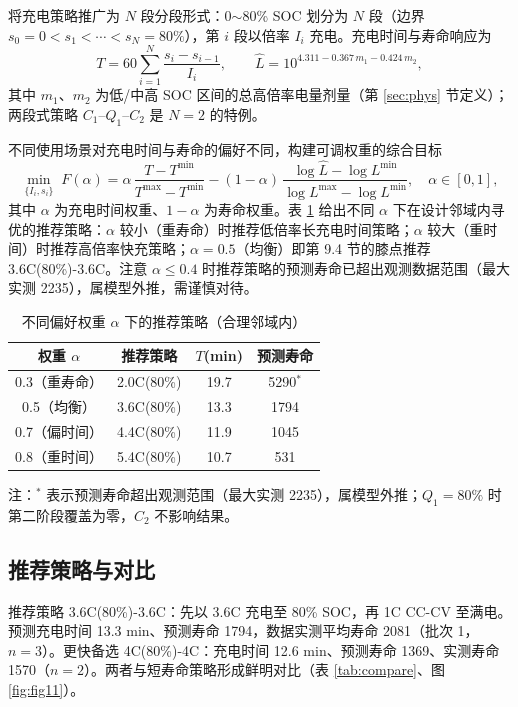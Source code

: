 \documentclass[withoutpreface]{cumcmthesis}
\begin{document}
将充电策略推广为 $N$ 段分段形式：0$\sim$80\% SOC 划分为 $N$ 段（边界 $s_0=0<s_1<\cdots<s_N=80\%$），第 $i$ 段以倍率 $I_i$ 充电。充电时间与寿命响应为
\begin{equation}\label{eq:multi}
T=60\sum_{i=1}^{N}\frac{s_i-s_{i-1}}{I_i},\qquad
\hat{L}=10^{4.311-0.367\,m_1-0.424\,m_2},
\end{equation}
其中 $m_1$、$m_2$ 为低/中高 SOC 区间的总高倍率电量剂量（第 \ref{sec:phys} 节定义）；两段式策略 $C_1$--$Q_1$--$C_2$ 是 $N=2$ 的特例。

不同使用场景对充电时间与寿命的偏好不同，构建可调权重的综合目标
\begin{equation}\label{eq:obj}
\min_{\{I_i,s_i\}}\; F(\alpha)=\alpha\,\frac{T-T^{\min}}{T^{\max}-T^{\min}}-(1-\alpha)\,\frac{\log\hat{L}-\log L^{\min}}{\log L^{\max}-\log L^{\min}},\quad \alpha\in[0,1],
\end{equation}
其中 $\alpha$ 为充电时间权重、$1-\alpha$ 为寿命权重。表 \ref{tab:weight} 给出不同 $\alpha$ 下在设计邻域内寻优的推荐策略：$\alpha$ 较小（重寿命）时推荐低倍率长充电时间策略；$\alpha$ 较大（重时间）时推荐高倍率快充策略；$\alpha=0.5$（均衡）即第 9.4 节的膝点推荐 3.6C(80\%)-3.6C。注意 $\alpha\le0.4$ 时推荐策略的预测寿命已超出观测数据范围（最大实测 2235），属模型外推，需谨慎对待。

\begin{table}[htbp]
\centering
\caption{不同偏好权重 $\alpha$ 下的推荐策略（合理邻域内）}
\label{tab:weight}
\begin{tabular}{cccc}
\toprule
权重 $\alpha$ & 推荐策略 & $T$(min) & 预测寿命 \\
\midrule
0.3（重寿命） & 2.0C(80\%) & 19.7 & 5290$^{*}$ \\
0.5（均衡） & 3.6C(80\%) & 13.3 & 1794 \\
0.7（偏时间） & 4.4C(80\%) & 11.9 & 1045 \\
0.8（重时间） & 5.4C(80\%) & 10.7 & 531 \\
\bottomrule
\end{tabular}
\end{table}
注：$^{*}$ 表示预测寿命超出观测范围（最大实测 2235），属模型外推；$Q_1=80\%$ 时第二阶段覆盖为零，$C_2$ 不影响结果。

\subsection{推荐策略与对比}

推荐策略 3.6C(80\%)-3.6C：先以 3.6C 充电至 80\% SOC，再 1C CC-CV 至满电。预测充电时间 13.3 min、预测寿命 1794，数据实测平均寿命 2081（批次 1，$n=3$）。更快备选 4C(80\%)-4C：充电时间 12.6 min、预测寿命 1369、实测寿命 1570（$n=2$）。两者与短寿命策略形成鲜明对比（表 \ref{tab:compare}、图 \ref{fig:fig11}）。
\end{document}
